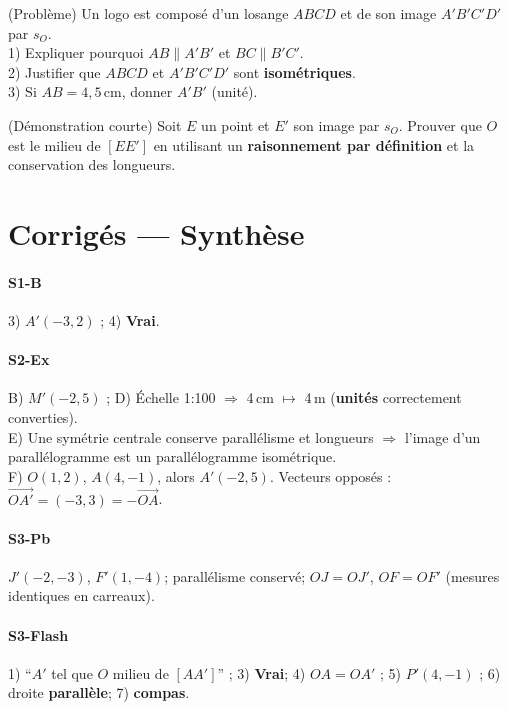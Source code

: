 \begin{exercice}[points 5]
	(Problème) Un logo est composé d’un losange $ABCD$ et de son image $A'B'C'D'$ par $s_O$.\\
	1) Expliquer pourquoi $AB \parallel A'B'$ et $BC \parallel B'C'$. \\
	2) Justifier que $ABCD$ et $A'B'C'D'$ sont \textbf{isométriques}. \\
	3) Si $AB=4,5$\,cm, donner $A'B'$ (unité).
\end{exercice}

\begin{exercice}[points 6]
	(Démonstration courte) Soit $E$ un point et $E'$ son image par $s_O$. Prouver que $O$ est le milieu de $[EE']$ en utilisant un \textbf{raisonnement par définition} et la conservation des longueurs.
\end{exercice}

\newpage
\section*{Corrigés — Synthèse}
\paragraph{S1-B}
3) $A'( {-}3,2)$ ; 4) \textbf{Vrai}. \\
\paragraph{S2-Ex}
B) $M'({-}2,5)$ ; D) Échelle 1:100 $\Rightarrow$ 4\,cm $\mapsto$ 4\,m (\textbf{unités} correctement converties). \\
E) Une symétrie centrale conserve parallélisme et longueurs $\Rightarrow$ l’image d’un parallélogramme est un parallélogramme isométrique. \\
F) $O(1,2)$, $A(4,{-}1)$, alors $A'({-}2,5)$. Vecteurs opposés : $\overrightarrow{OA'}=(-3,3)=-\overrightarrow{OA}$. \\
\paragraph{S3-Pb}
$J'(-2,{-}3)$, $F'(1,{-}4)$; parallélisme conservé; $OJ=OJ'$, $OF=OF'$ (mesures identiques en carreaux). \\
\paragraph{S3-Flash}
1) ``$A'$ tel que $O$ milieu de $[AA']$'' ; 3) \textbf{Vrai}; 4) $OA=OA'$ ; 5) $P' (4,{-}1)$ ; 6) droite \textbf{parallèle}; 7) \textbf{compas}. \\
